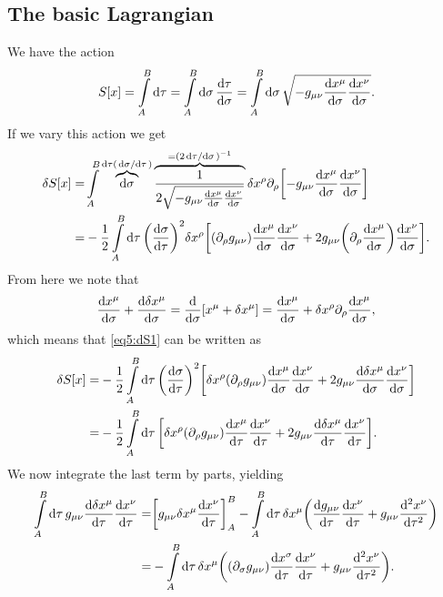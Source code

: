 \documentclass[11pt,a4paper, 
swedish, english %
]{article}
\begin{document}
\subsection{The basic Lagrangian}
We have the action
\begin{equation}
S[x]=\int_A^B\rd\tau=\int_A^B\rd\sigma\,\dv{\tau}{\sigma}
=\int_A^B\rd\sigma\,
\sqrt{-g_{\mu\nu}\dv{x^\mu}{\sigma}\dv{x^\nu}{\sigma}}.
\end{equation}
If we vary this action we get
\vspace{-1em}
\begin{equation}\label{eq5:dS1}
\begin{aligned}
\delta{S}[x]=&\int_A^B\overbrace{\rd\sigma}^{\rd\tau(\dv*{\sigma}{\tau})}
\overbrace{\frac{1}{2\sqrt{-g_{\mu\nu}\dv{x^\mu}{\sigma}\dv{x^\nu}{\sigma}}}}
^{=(2\dv*{\tau}{\sigma})^{-1}}
\delta{x}^\rho\pd_\rho\qty[-g_{\mu\nu}\dv{x^\mu}{\sigma}\dv{x^\nu}{\sigma}
]\\
=&-\frac{1}{2}\int_A^B\rd\tau\,
\qty(\dv{\sigma}{\tau})^2 \delta{x}^\rho
\qty[(\pd_{\rho}g_{\mu\nu})\dv{x^\mu}{\sigma}\dv{x^\nu}{\sigma}
+2g_{\mu\nu}\qty(\pd_{\rho}\dv{x^\mu}{\sigma})\dv{x^\nu}{\sigma}
].
\end{aligned}
\end{equation}
From here we note that
\begin{equation}
\dv{x^\mu}{\sigma}+\dv{\delta{x}^\mu}{\sigma}
=\dv{\sigma}\qty[x^\mu+\delta{x}^\mu]
=\dv{x^\mu}{\sigma}+\delta{x}^\rho\partial_\rho\dv{x^\mu}{\sigma},
\end{equation}
which means that \eqref{eq5:dS1} can be written as
\begin{equation}\label{eq5:dS2}
\begin{aligned}
\delta{S}[x]=&-\frac{1}{2}\int_A^B\rd\tau\,\qty(\dv{\sigma}{\tau})^2 
\qty[ \delta{x}^\rho(\pd_{\rho}g_{\mu\nu})
\dv{x^\mu}{\sigma}\dv{x^\nu}{\sigma}
+2g_{\mu\nu}\dv{\delta{x}^\mu}{\sigma}\dv{x^\nu}{\sigma}
]\\
=&-\frac{1}{2}\int_A^B\rd\tau\,
\qty[ \delta{x}^\rho(\pd_{\rho}g_{\mu\nu})
\dv{x^\mu}{\tau}\dv{x^\nu}{\tau}
+2g_{\mu\nu}\dv{\delta{x}^\mu}{\tau}\dv{x^\nu}{\tau}
].
\end{aligned}
\end{equation}
We now integrate the last term by parts, yielding
\begin{equation}
\begin{aligned}
\int_A^B\rd\tau\,g_{\mu\nu}\dv{\delta{x}^\mu}{\tau}\dv{x^\nu}{\tau}
=&\qty[g_{\mu\nu}\delta{x}^\mu\dv{x^\nu}{\tau}]_A^B
-\int_A^B\rd\tau\,\delta{x}^\mu
\qty(\dv{g_{\mu\nu}}{\tau}\dv{x^\nu}{\tau}
+g_{\mu\nu}\dv[2]{x^\nu}{\tau})\\
=&-\int_A^B\rd\tau\,\delta{x}^\mu
\qty((\pd_\sigma g_{\mu\nu})\dv{x^\sigma}{\tau}\dv{x^\nu}{\tau}
+g_{\mu\nu}\dv[2]{x^\nu}{\tau}).
\end{aligned}
\end{equation}
\end{document}
